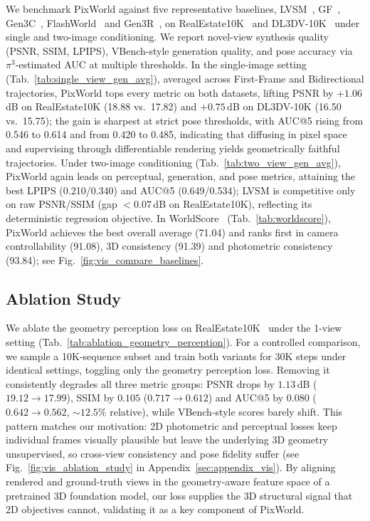 We benchmark PixWorld against five representative baselines, LVSM~\citep{jinlvsm}, GF~\citep{wu2025geometry}, Gen3C~\citep{ren2025gen3c}, FlashWorld~\citep{li2025flashworld} and Gen3R~\citep{huang2026gen3r}, on RealEstate10K~\citep{zhou2018stereo} and DL3DV-10K~\citep{ling2024dl3dv} under single and two-image conditioning. We report novel-view synthesis quality (PSNR, SSIM, LPIPS), VBench-style generation quality, and pose accuracy via $\pi^3$-estimated AUC at multiple thresholds. In the single-image setting (Tab.~\ref{tab:single_view_gen_avg}), averaged across First-Frame and Bidirectional trajectories, PixWorld tops every metric on both datasets, lifting PSNR by $+1.06$\,dB on RealEstate10K (18.88 vs.\ 17.82) and $+0.75$\,dB on DL3DV-10K (16.50 vs.\ 15.75); the gain is sharpest at strict pose thresholds, with AUC@5 rising from 0.546 to 0.614 and from 0.420 to 0.485, indicating that diffusing in pixel space and supervising through differentiable rendering yields geometrically faithful trajectories. Under two-image conditioning (Tab.~\ref{tab:two_view_gen_avg}), PixWorld again leads on perceptual, generation, and pose metrics, attaining the best LPIPS (0.210/0.340) and AUC@5 (0.649/0.534); LVSM is competitive only on raw PSNR/SSIM (gap $<0.07$\,dB on RealEstate10K), reflecting its deterministic regression objective. In WorldScore~\citep{duan2025worldscore} (Tab.~\ref{tab:worldscore}), PixWorld achieves the best overall average (71.04) and ranks first in camera controllability (91.08), 3D consistency (91.39) and photometric consistency (93.84); see Fig.~\ref{fig:vis_compare_baselines}.


\subsection{Ablation Study}
\label{subsec:ablation}


We ablate the geometry perception loss on RealEstate10K~\citep{zhou2018stereo} under the 1-view setting (Tab.~\ref{tab:ablation_geometry_perception}). For a controlled comparison, we sample a 10K-sequence subset and train both variants for 30K steps under identical settings, toggling only the geometry perception loss. Removing it consistently degrades all three metric groups: PSNR drops by $1.13$\,dB ($19.12 \!\to\! 17.99$), SSIM by $0.105$ ($0.717 \!\to\! 0.612$) and AUC@5 by $0.080$ ($0.642 \!\to\! 0.562$, $\sim$$12.5\%$ relative), while VBench-style scores barely shift. This pattern matches our motivation: 2D photometric and perceptual losses keep individual frames visually plausible but leave the underlying 3D geometry unsupervised, so cross-view consistency and pose fidelity suffer (see Fig.~\ref{fig:vis_ablation_study} in Appendix~\ref{sec:appendix_vis}). By aligning rendered and ground-truth views in the geometry-aware feature space of a pretrained 3D foundation model, our loss supplies the 3D structural signal that 2D objectives cannot, validating it as a key component of PixWorld.